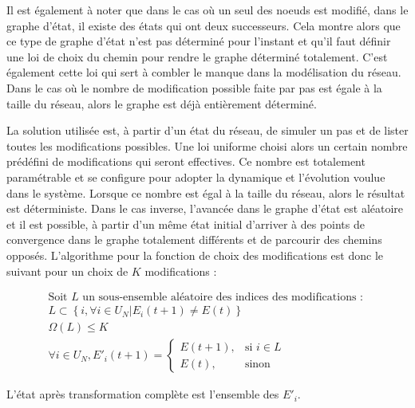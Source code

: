 \documentclass[11pt, a4paper]{article}
\begin{document}
Il est également à noter que dans le cas où un seul des noeuds est modifié,
dans le graphe d'état, il existe des états qui ont deux successeurs. Cela
montre alors que ce type de graphe d'état n'est pas déterminé pour l'instant et
qu'il faut définir une loi de choix du chemin pour rendre le graphe déterminé
totalement. C'est également cette loi qui sert à combler le manque dans la
modélisation du réseau. Dans le cas où le nombre de modification possible faite
par pas est égale à la taille du réseau, alors le graphe est déjà entièrement
déterminé.

La solution utilisée est, à partir d'un état du réseau, de simuler un pas et de
lister toutes les modifications possibles. Une loi uniforme choisi alors un
certain nombre prédéfini de modifications qui seront effectives. Ce nombre est
totalement paramétrable et se configure pour adopter la dynamique et
l'évolution voulue dans le système. Lorsque ce nombre est égal à la taille du
réseau, alors le résultat est déterministe. Dans le cas inverse, l'avancée dans
le graphe d'état est aléatoire et il est possible, à partir d'un même état
initial d'arriver à des points de convergence dans le graphe totalement
différents et de parcourir des chemins opposés. L'algorithme pour la fonction
de choix des modifications est donc le suivant pour un choix de $K$
modifications :

\begin{multline}
    \mbox{Soit } L \mbox{ un sous-ensemble aléatoire des indices des
    modifications : } \\
    L \subset \left\{i, \forall i \in U_N | E_i(t + 1) \ne E(t)\right\} \\
    \Omega(L) \le K \\
    \forall i \in U_N, E'_i(t + 1) = \left\{\begin{array}{rl}
        E(t + 1), & \mbox{si } i \in L \\
        E(t), & \mbox{sinon}
    \end{array}\right.
\end{multline}

L'état après transformation complète est l'ensemble des $E'_i$. \\
\end{document}

